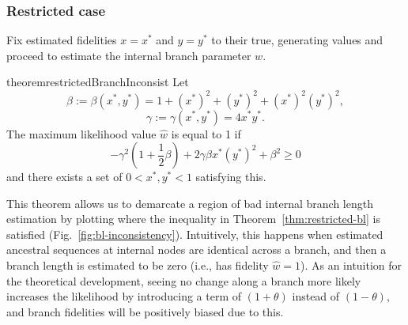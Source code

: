 \documentclass{article}
\begin{document}
\subsubsection*{Restricted case}

Fix estimated fidelities $x=x^*$ and $y=y^*$ to their true, generating values and proceed to estimate the internal branch parameter $w$.
\begin{restatable}{theorem}{restrictedBranchInconsist}
\label{thm:restricted-bl}
Let
$$
\beta := \beta(x^*, y^*) = 1+(x^*)^2+(y^*)^2+(x^*)^2(y^*)^2,
$$
$$
\gamma := \gamma(x^*, y^*) = 4x^*y^*.
$$
The maximum likelihood value $\hat{w}$ is equal to 1 if
$$
-\gamma^2\left(1 + \frac{1}{2}\beta\right) + 2\gamma\beta x^*(y^*)^2 + \beta^2 \ge 0
$$
and there exists a set of $0 < x^*, y^* < 1$ satisfying this.
\end{restatable}
This theorem allows us to demarcate a region of bad internal branch length estimation by plotting where the inequality in Theorem~\ref{thm:restricted-bl} is satisfied (Fig.~\ref{fig:bl-inconsistency}).
Intuitively, this happens when estimated ancestral sequences at internal nodes are identical across a branch, and then a branch length is estimated to be zero (i.e., has fidelity $\hat{w} = 1$).
As an intuition for the theoretical development, seeing no change along a branch more likely increases the likelihood by introducing a term of $(1+\theta)$ instead of $(1-\theta)$, and branch fidelities will be positively biased due to this.
\end{document}
